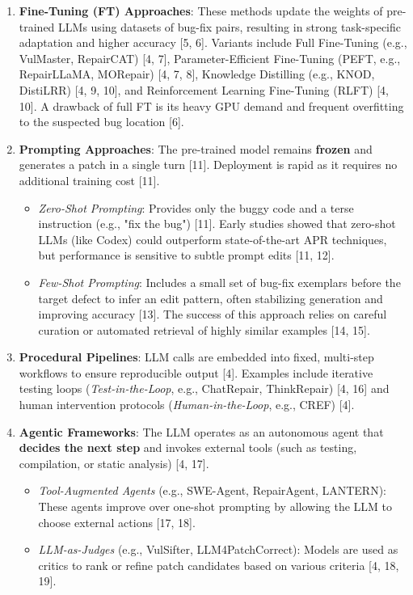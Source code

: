 \begin{enumerate}
    \item \textbf{Fine-Tuning (FT) Approaches}:
    These methods update the weights of pre-trained LLMs using datasets of bug-fix pairs, resulting in strong task-specific adaptation and higher accuracy [5, 6]. Variants include Full Fine-Tuning (e.g., VulMaster, RepairCAT) [4, 7], Parameter-Efficient Fine-Tuning (PEFT, e.g., RepairLLaMA, MORepair) [4, 7, 8], Knowledge Distilling (e.g., KNOD, DistiLRR) [4, 9, 10], and Reinforcement Learning Fine-Tuning (RLFT) [4, 10]. A drawback of full FT is its heavy GPU demand and frequent overfitting to the suspected bug location [6].

    \item \textbf{Prompting Approaches}:
    The pre-trained model remains \textbf{frozen} and generates a patch in a single turn [11]. Deployment is rapid as it requires no additional training cost [11].
    \begin{itemize}
        \item \emph{Zero-Shot Prompting}: Provides only the buggy code and a terse instruction (e.g., "fix the bug") [11]. Early studies showed that zero-shot LLMs (like Codex) could outperform state-of-the-art APR techniques, but performance is sensitive to subtle prompt edits [11, 12].
        \item \emph{Few-Shot Prompting}: Includes a small set of bug-fix exemplars before the target defect to infer an edit pattern, often stabilizing generation and improving accuracy [13]. The success of this approach relies on careful curation or automated retrieval of highly similar examples [14, 15].
    \end{itemize}

    \item \textbf{Procedural Pipelines}:
    LLM calls are embedded into fixed, multi-step workflows to ensure reproducible output [4]. Examples include iterative testing loops (\emph{Test-in-the-Loop}, e.g., ChatRepair, ThinkRepair) [4, 16] and human intervention protocols (\emph{Human-in-the-Loop}, e.g., CREF) [4].

    \item \textbf{Agentic Frameworks}:
    The LLM operates as an autonomous agent that \textbf{decides the next step} and invokes external tools (such as testing, compilation, or static analysis) [4, 17].
    \begin{itemize}
        \item \emph{Tool-Augmented Agents} (e.g., SWE-Agent, RepairAgent, LANTERN): These agents improve over one-shot prompting by allowing the LLM to choose external actions [17, 18].
        \item \emph{LLM-as-Judges} (e.g., VulSifter, LLM4PatchCorrect): Models are used as critics to rank or refine patch candidates based on various criteria [4, 18, 19].
    \end{itemize}
\end{enumerate}

